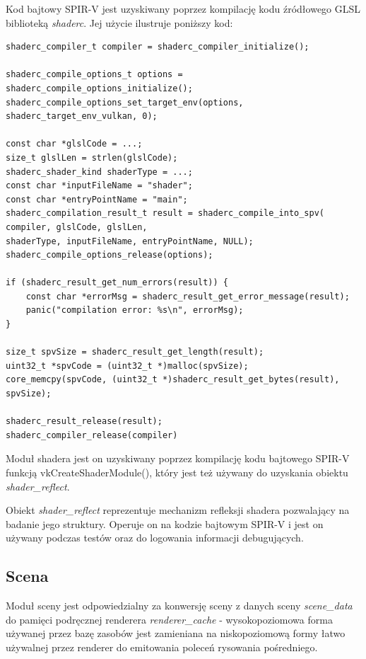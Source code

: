 Kod bajtowy SPIR-V jest uzyskiwany poprzez kompilację kodu źródłowego GLSL biblioteką \textit{shaderc}.
Jej użycie ilustruje poniższy kod:
\lstset{language=C}
\begin{lstlisting}[caption={Kompilacja kodu źródłowego GLSL biblioteką \textit{shaderc}},captionpos=b]
shaderc_compiler_t compiler = shaderc_compiler_initialize();

shaderc_compile_options_t options = shaderc_compile_options_initialize();
shaderc_compile_options_set_target_env(options, shaderc_target_env_vulkan, 0);

const char *glslCode = ...;
size_t glslLen = strlen(glslCode);
shaderc_shader_kind shaderType = ...;
const char *inputFileName = "shader";
const char *entryPointName = "main";
shaderc_compilation_result_t result = shaderc_compile_into_spv(
compiler, glslCode, glslLen,
shaderType, inputFileName, entryPointName, NULL);
shaderc_compile_options_release(options);

if (shaderc_result_get_num_errors(result)) {
	const char *errorMsg = shaderc_result_get_error_message(result);
	panic("compilation error: %s\n", errorMsg);
}

size_t spvSize = shaderc_result_get_length(result);
uint32_t *spvCode = (uint32_t *)malloc(spvSize);
core_memcpy(spvCode, (uint32_t *)shaderc_result_get_bytes(result), spvSize);

shaderc_result_release(result);
shaderc_compiler_release(compiler)
\end{lstlisting}

Moduł shadera jest on uzyskiwany poprzez kompilację kodu bajtowego SPIR-V funkcją vkCreateShaderModule(), który jest też używany do uzyskania obiektu \textit{shader\_reflect}.

Obiekt \textit{shader\_reflect} reprezentuje mechanizm refleksji shadera pozwalający na badanie jego struktury.
Operuje on na kodzie bajtowym SPIR-V i jest on używany podczas testów oraz do logowania informacji debugujących.


\subsection{Scena}

Moduł sceny jest odpowiedzialny za konwersję sceny z danych sceny \textit{scene\_data} do pamięci podręcznej renderera \textit{renderer\_cache} - wysokopoziomowa forma używanej przez bazę zasobów jest zamieniana na niskopoziomową formy łatwo używalnej przez renderer do emitowania poleceń rysowania pośredniego.

